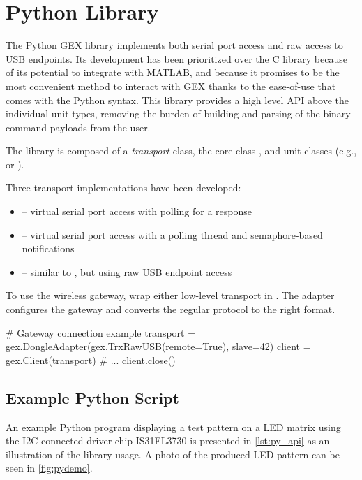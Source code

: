 \section{Python Library}

The Python GEX library implements both serial port access and raw access to \gls{USB} endpoints. Its development has been prioritized over the C library because of its potential to integrate with MATLAB, and because it promises to be the most convenient method to interact with GEX thanks to the ease-of-use that comes with the Python syntax. This library provides a high level \gls{API} above the individual unit types, removing the burden of building and parsing of the binary command payloads from the user.

The library is composed of a \textit{transport} class, the core class , and unit classes (e.g.,  or ). 

\noindent
Three transport implementations have been developed:

\begin{itemize}
    \item {} -- virtual serial port access with polling for a response

    \item {} -- virtual serial port access with a polling thread and semaphore-based notifications

    \item {} -- similar to , but using raw USB endpoint access
\end{itemize}

To use the wireless gateway, wrap either low-level transport in . The adapter configures the gateway and converts the regular protocol to the right format.

\begin{pythoncode}
# Gateway connection example
transport = gex.DongleAdapter(gex.TrxRawUSB(remote=True), slave=42)
client = gex.Client(transport)
# ...
client.close()
\end{pythoncode}

\subsection{Example Python Script} \label{sec:ex_python_script}

An example Python program displaying a test pattern on a \gls{LED} matrix using the \gls{I2C}-connected driver chip IS31FL3730 is presented in \cref{lst:py_api} as an illustration of the library usage. A photo of the produced \gls{LED} pattern can be seen in \cref{fig:pydemo}.

